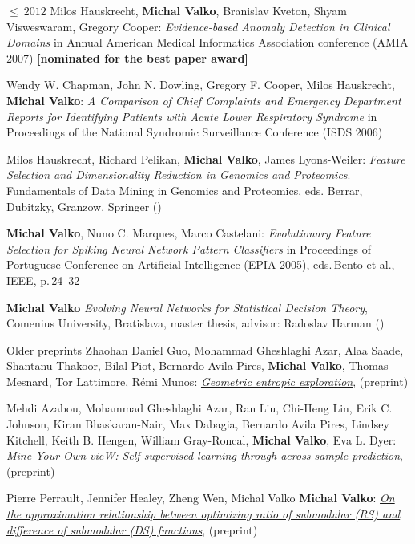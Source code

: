 \documentclass{resume}
\begin{document}
\begin{category}{$\leq\ 2012$}
\citembullet   
Milos Hauskrecht, {\bf Michal Valko}, Branislav Kveton, Shyam Visweswaram, Gregory Cooper:
\emph{Evidence-based Anomaly Detection in Clinical Domains} in Annual American Medical Informatics
Association conference ({\sf AMIA 2007}) {\bf [nominated for the best paper award]}


\citembullet  
Wendy W. Chapman, John N. Dowling, Gregory F. Cooper, Milos Hauskrecht, {\bf Michal Valko}: \emph{A Comparison of Chief Complaints and Emergency Department Reports for Identifying Patients with Acute Lower Respiratory Syndrome} in Proceedings of the National Syndromic Surveillance Conference ({\sf ISDS 2006})

\citembullet  
Milos Hauskrecht, Richard Pelikan, {\bf Michal Valko}, James Lyons-Weiler:
\emph{Feature Selection and Dimensionality Reduction in Genomics and
Proteomics}. Fundamentals of Data Mining in Genomics and Proteomics,
eds. Berrar, Dubitzky, Granzow. Springer ({})

\citembullet 
{\bf Michal Valko}, Nuno C. Marques, Marco Castelani: \emph{Evolutionary Feature
Selection for Spiking Neural Network Pattern Classifiers} in
Proceedings of Portuguese Conference on Artificial Intelligence
({\sf EPIA 2005}), eds.\,Bento et al., IEEE, p.\,24--32

\citembullet 
{\bf Michal Valko} \emph{Evolving Neural Networks for Statistical Decision
Theory}, Comenius University, Bratislava, master thesis, advisor: Radoslav Harman ({})
\end{category}

\begin{category}{Older preprints}
\citembullet
Zhaohan Daniel Guo, Mohammad Gheshlaghi Azar, Alaa Saade, Shantanu Thakoor, Bilal Piot, Bernardo Avila Pires, {\bf Michal Valko}, Thomas Mesnard, Tor Lattimore, R\' emi Munos: 
\href{https://arxiv.org/pdf/2101.02055.pdf}{\emph{Geometric entropic exploration}},
({\sf preprint}) 

\citembullet
Mehdi Azabou, Mohammad Gheshlaghi Azar, Ran Liu, Chi-Heng Lin, Erik C. Johnson, Kiran Bhaskaran-Nair, Max Dabagia, 
Bernardo Avila Pires, Lindsey Kitchell,
Keith B. Hengen, William Gray-Roncal, {\bf Michal Valko}, Eva L. Dyer:
\href{https://arxiv.org/pdf/2102.10106.pdf}{\emph{Mine Your Own vieW: Self-supervised learning through across-sample prediction}},
({\sf preprint}) 

\citembullet
Pierre Perrault, Jennifer Healey, Zheng Wen, Michal Valko {\bf Michal Valko}: 
\href{https://arxiv.org/pdf/2101.01631.pdf}{\emph{On the approximation relationship between optimizing ratio of submodular (RS) and difference of submodular (DS) functions}},
 ({\sf preprint}) 
\end{category}
\end{document}
